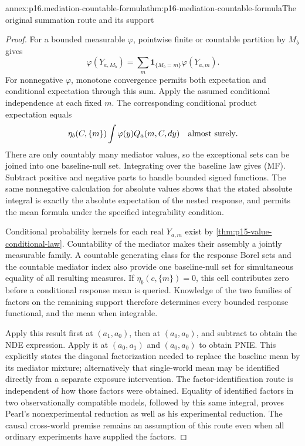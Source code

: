 \begin{annexitem}{annex:p16.mediation-countable-formula}{thm:p16-mediation-countable-formula}{The original summation route and its support}
\begin{proof}
For a bounded measurable \(\varphi\), pointwise finite or countable
partition by \(M_b\) gives
\[
 \varphi(Y_{a,M_b})=\sum_m\mathbf1_{\{M_b=m\}}\varphi(Y_{a,m}).
\]
For nonnegative \(\varphi\), monotone convergence permits both expectation
and conditional expectation through this sum. Apply the assumed
conditional independence at each fixed \(m\). The corresponding
conditional product expectation equals
\[
 \eta_b(C,\{m\})\int\varphi(y)Q_a(m,C,dy)
 \quad\hbox{almost surely}.
\]
There are only countably many mediator values, so the exceptional sets
can be joined into one baseline-null set. Integrating over the baseline
law gives (MF). Subtract positive and negative parts to handle bounded
signed functions. The same nonnegative calculation for absolute values
shows that the stated absolute integral is exactly the absolute
expectation of the nested response, and permits the mean formula under
the specified integrability condition.

Conditional probability kernels for each real \(Y_{a,m}\) exist by
\cref{thm:p15-value-conditional-law}. Countability of the mediator makes
their assembly a jointly measurable family. A countable generating class
for the response Borel sets and the countable mediator index also provide
one baseline-null set for simultaneous equality of all resulting measures.
If \(\eta_b(c,\{m\})=0\), this cell contributes zero before a conditional
response mean is queried. Knowledge of the two families of factors on
the remaining support therefore determines every bounded response
functional, and the mean when integrable.

Apply this result first at \((a_1,a_0)\), then at \((a_0,a_0)\), and
subtract to obtain the NDE expression. Apply it at \((a_0,a_1)\) and
\((a_0,a_0)\) to obtain PNIE. This explicitly states the diagonal
factorization needed to replace the baseline mean by its mediator
mixture; alternatively that single-world mean may be identified directly
from a separate exposure intervention. The factor-identification route
is independent of how those factors were obtained. Equality of identified
factors in two observationally compatible models, followed by this same
integral, proves Pearl's nonexperimental reduction as well as his
experimental reduction. The causal cross-world premise remains an assumption
of this route even when all ordinary experiments have supplied the factors.
\end{proof}
\end{annexitem}

